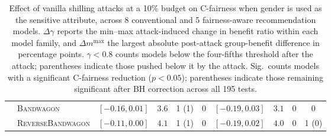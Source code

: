 \begin{table}
\begin{adjustbox}{max width=\textwidth}
\begin{tabular}{l l cccc cccc}
& \textsc{Bandwagon} & $[-0.16, 0.01]$ & $3.6$ & 1 (1) & 0 & $[-0.19, 0.03]$ & $3.1$ & 0 & 0 \\
& \textsc{ReverseBandwagon} & $[-0.11, 0.00]$ & $4.1$ & 1 (1) & 0 & $[-0.19, 0.02]$ & $4.0$ & 0 & 1 (0) \\
\bottomrule
\end{tabular}
\end{adjustbox}
\caption{Effect of vanilla shilling attacks at a 10\% budget on C-fairness when gender is used as the sensitive attribute, across 8 conventional and 5 fairness-aware recommendation models. $\Delta\gamma$ reports the min--max attack-induced change in benefit ratio within each model family, and $\Delta m^{\max}$ the largest absolute post-attack group-benefit difference in percentage points. $\gamma < 0.8$ counts models below the four-fifths threshold after the attack; parentheses indicate those pushed below it by the attack. Sig.\ counts models with a significant C-fairness reduction ($p < 0.05$); parentheses indicate those remaining significant after BH correction across all 195 tests.}
\label{tab:vanilla_attacks_gender_b10}
\end{table}
